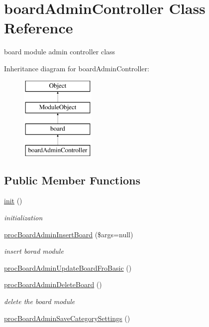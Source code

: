 \hypertarget{classboardAdminController}{}\section{board\+Admin\+Controller Class Reference}
\label{classboardAdminController}


board module admin controller class  


Inheritance diagram for board\+Admin\+Controller\+:\begin{figure}[H]
\begin{center}
\leavevmode
\includegraphics[height=4.000000cm]{classboardAdminController}
\end{center}
\end{figure}
\subsection*{Public Member Functions}
\begin{DoxyCompactItemize}
\item 
\hyperlink{classboardAdminController_a9e73a19f4dd17efa11a5c1340448c75f}{init} ()
\begin{DoxyCompactList}\small\item\em initialization \end{DoxyCompactList}\item 
\hyperlink{classboardAdminController_a4d236333faef58446094c8d5d66228b1}{proc\+Board\+Admin\+Insert\+Board} (\$args=null)
\begin{DoxyCompactList}\small\item\em insert borad module \end{DoxyCompactList}\item 
\hyperlink{classboardAdminController_a5bb01a312930634bf43e59dd9fef87e5}{proc\+Board\+Admin\+Update\+Board\+Fro\+Basic} ()
\item 
\hyperlink{classboardAdminController_a1a29957a0a3b7751bff0969dfeae966a}{proc\+Board\+Admin\+Delete\+Board} ()
\begin{DoxyCompactList}\small\item\em delete the board module \end{DoxyCompactList}\item 
\hyperlink{classboardAdminController_a0a35a01898405781ecaecca2bc34e709}{proc\+Board\+Admin\+Save\+Category\+Settings} ()
\end{DoxyCompactItemize}
